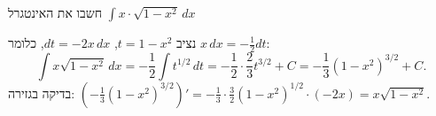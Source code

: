 
\begin{question}
חשבו את האינטגרל $\displaystyle\int x\cdot\sqrt{1-x^2}\,dx$
\end{question}

\begin{solution}
נציב $t=1-x^2$, $dt=-2x\,dx$, כלומר $x\,dx=-\frac12dt$:
\[ \int x\sqrt{1-x^2}\,dx=-\frac12\int t^{1/2}\,dt=-\frac12\cdot\frac{2}{3}t^{3/2}+C=\boxed{-\frac13(1-x^2)^{3/2}+C}. \]
בדיקה בגזירה: $\left(-\frac13(1-x^2)^{3/2}\right)'=-\frac13\cdot\frac32(1-x^2)^{1/2}\cdot(-2x)=x\sqrt{1-x^2}$.
\end{solution}
